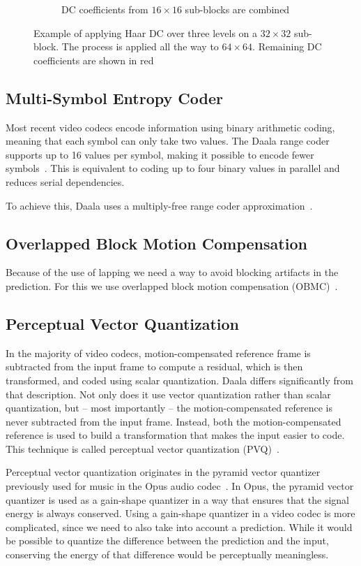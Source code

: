 \documentclass[english,conference,10pt]{IEEEtran}
\begin{document}
\begin{figure}
\begin{subfigure}[t]{0.49\columnwidth}
		\caption{DC coefficients from $16\times 16$ sub-blocks are combined}
	\end{subfigure}
	\caption{Example of applying Haar DC over three levels on a $32\times 32$
		sub-block. The process is applied all the way to $64\times 64$. Remaining DC
		coefficients are shown in red}
	\label{fig:haardc}
\end{figure}

\subsection{Multi-Symbol Entropy Coder}

Most recent video codecs encode information using binary arithmetic
coding, meaning that each symbol can only take two values. The Daala
range coder supports up to 16 values per symbol, making it possible
to encode fewer symbols~\cite{derfTools}. This is equivalent to
coding up to four binary values in parallel and reduces serial dependencies. 

To achieve this, Daala uses a multiply-free range coder approximation~\cite{stuiver1998piecewise}. 


\subsection{Overlapped Block Motion Compensation}

Because of the use of lapping we need a way to avoid blocking artifacts
in the prediction. For this we use overlapped block motion compensation
(OBMC)~\cite{OBMC}.


\subsection{Perceptual Vector Quantization}

In the majority of video codecs, motion-compensated reference frame
is subtracted from the input frame to compute a residual, which is
then transformed, and coded using scalar quantization. Daala differs
significantly from that description. Not only does it use vector quantization
rather than scalar quantization, but -- most importantly -- the motion-compensated
reference is never subtracted from the input frame. Instead, both
the motion-compensated reference is used to build a transformation
that makes the input easier to code. This technique is called perceptual
vector quantization (PVQ)~\cite{valin2015spie}.

Perceptual vector quantization originates in the pyramid vector quantizer
previously used for music in the Opus audio codec~\cite{ValinAES}. In Opus,
the pyramid vector quantizer is used as a gain-shape quantizer in a way that
ensures that the signal energy is always conserved. Using a gain-shape
quantizer in a video codec is more complicated, since we need to also take
into account a prediction. While it would be possible to quantize the difference
between the prediction and the input, conserving the energy of that
difference would be perceptually meaningless.
\end{document}
